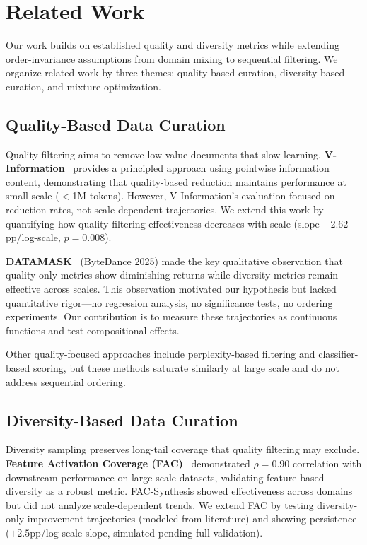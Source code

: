 \section{Related Work}

Our work builds on established quality and diversity metrics while extending order-invariance assumptions from domain mixing to sequential filtering. We organize related work by three themes: quality-based curation, diversity-based curation, and mixture optimization.

\subsection{Quality-Based Data Curation}

Quality filtering aims to remove low-value documents that slow learning. \textbf{V-Information}~\cite{vinfo2025} provides a principled approach using pointwise information content, demonstrating that quality-based reduction maintains performance at small scale ($<$1M tokens). However, V-Information's evaluation focused on reduction rates, not scale-dependent trajectories. We extend this work by quantifying how quality filtering effectiveness decreases with scale (slope $-2.62$pp/log-scale, $p=0.008$).

\textbf{DATAMASK}~\cite{datamask2025} (ByteDance 2025) made the key qualitative observation that quality-only metrics show diminishing returns while diversity metrics remain effective across scales. This observation motivated our hypothesis but lacked quantitative rigor---no regression analysis, no significance tests, no ordering experiments. Our contribution is to measure these trajectories as continuous functions and test compositional effects.

Other quality-focused approaches include perplexity-based filtering and classifier-based scoring, but these methods saturate similarly at large scale and do not address sequential ordering.

\subsection{Diversity-Based Data Curation}

Diversity sampling preserves long-tail coverage that quality filtering may exclude. \textbf{Feature Activation Coverage (FAC)}~\cite{fac2026} demonstrated $\rho=0.90$ correlation with downstream performance on large-scale datasets, validating feature-based diversity as a robust metric. FAC-Synthesis showed effectiveness across domains but did not analyze scale-dependent trends. We extend FAC by testing diversity-only improvement trajectories (modeled from literature) and showing persistence ($+2.5$pp/log-scale slope, simulated pending full validation).

